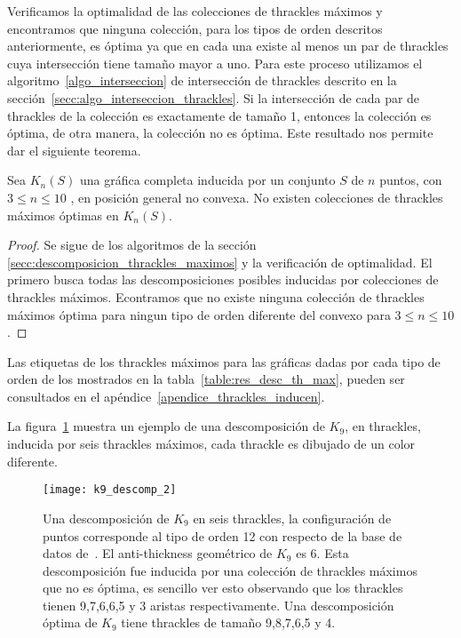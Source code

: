   Verificamos la optimalidad de las colecciones de thrackles máximos y encontramos
  que ninguna colección, para los tipos de orden descritos anteriormente,
  es óptima ya que en cada una existe al menos un par de thrackles cuya intersección tiene
  tamaño mayor a uno. Para este proceso utilizamos el algoritmo~\ref{algo_interseccion} de intersección de
  thrackles descrito en la sección~\ref{secc:algo_interseccion_thrackles}. Si la intersección
  de cada par de thrackles de la colección es exactamente de tamaño 1, entonces la
  colección es óptima, de otra manera, la colección no es óptima. Este resultado nos
  permite dar el siguiente teorema.
  \begin{theorem}\label{teo:coleccion_optima}
    Sea $K_n(S)$ una gráfica completa inducida por un conjunto $S$ de $n$ puntos,
    con $3\leq n\leq 10$ , en posición general no convexa. No existen
    colecciones de thrackles máximos óptimas en $K_n(S)$.
  \end{theorem}
  \begin{proof}
    Se sigue de los algoritmos de la sección \ref{secc:descomposicion_thrackles_maximos}
    y la verificación de optimalidad. El primero busca todas
    las descomposiciones posibles inducidas por colecciones de thrackles máximos.
    Econtramos que no existe ninguna
    colección de thrackles máximos óptima para ningun tipo de orden diferente del convexo para
    $3\leq n\leq 10$.
  \end{proof}

  Las etiquetas de los thrackles máximos para las gráficas dadas por cada
  tipo de orden de los mostrados en la tabla~\ref{table:res_desc_th_max}, pueden
  ser consultados en el apéndice~\ref{apendice_thrackles_inducen}.

  La figura~\ref{fig:k9_descomp} muestra un ejemplo de una
  descomposición de $K_9$, en thrackles, inducida por seis
  thrackles máximos, cada thrackle es dibujado de un color diferente.

  \begin{figure}
    \centering
    \texttt{[image: k9\_descomp\_2]}
    \caption{Una descomposición de $K_9$ en seis thrackles, la configuración de
    puntos corresponde al tipo de orden 12 con respecto de la base de datos
    de~\cite{Aichholzer2001}. El anti-thickness geométrico de $K_9$ es
    6. Esta descomposición fue inducida por una colección
    de thrackles máximos que no es óptima, es sencillo ver esto observando que
    los thrackles tienen 9,7,6,6,5 y 3 aristas respectivamente.
    Una descomposición óptima de $K_9$ tiene thrackles de tamaño 9,8,7,6,5 y 4.}
    \label{fig:k9_descomp}
  \end{figure}


